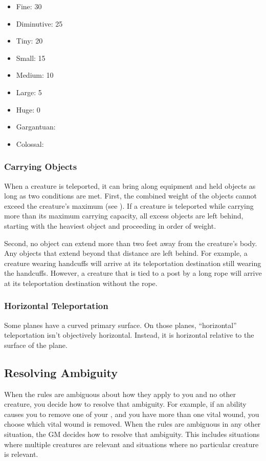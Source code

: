             \begin{itemize}
                \item Fine: 30
                \item Diminutive: 25
                \item Tiny: 20
                \item Small: 15
                \item Medium: 10
                \item Large: 5
                \item Huge: 0
                \item Gargantuan: 
                \item Colossal: 
            \end{itemize}

        \subsubsection{Carrying Objects}
            When a creature is teleported, it can bring along equipment and held objects as long as two conditions are met.
            First, the combined weight of the objects cannot exceed the creature's maximum  (see ).
            If a creature is teleported while carrying more than its maximum carrying capacity, all excess objects are left behind, starting with the heaviest object and proceeding in order of weight.

            Second, no object can extend more than two feet away from the creature's body.
            Any objects that extend beyond that distance are left behind.
            For example, a creature wearing handcuffs will arrive at its teleportation destination still wearing the handcuffs.
            However, a creature that is tied to a post by a long rope will arrive at its teleportation destination without the rope.

        \subsubsection{Horizontal Teleportation}
            Some planes have a curved primary surface.
            On those planes, ``horizontal'' teleportation isn't objectively horizontal.
            Instead, it is horizontal relative to the surface of the plane.

    \subsection{Resolving Ambiguity}\label{Resolving Ambiguity}
        When the rules are ambiguous about how they apply to you and no other creature, you decide how to resolve that ambiguity.
        For example, if an ability causes you to remove one of your , and you have more than one vital wound, you choose which vital wound is removed.
        When the rules are ambiguous in any other situation, the GM decides how to resolve that ambiguity.
        This includes situations where multiple creatures are relevant and situations where no particular creature is relevant.
